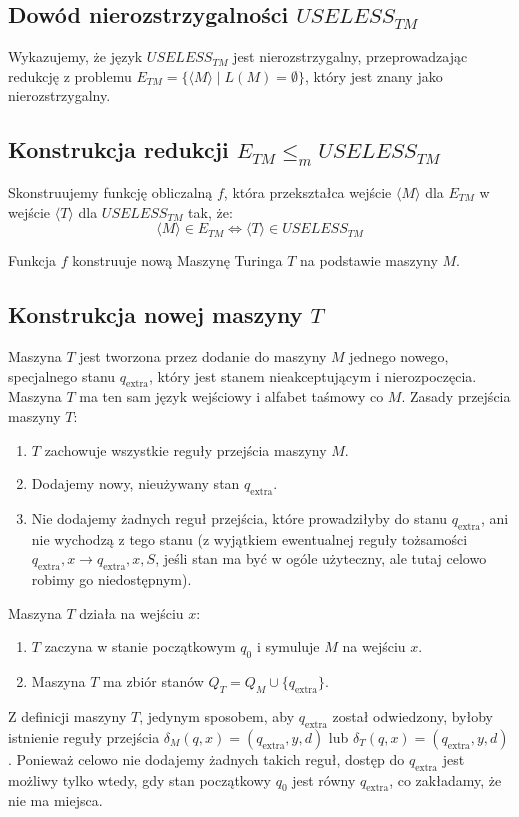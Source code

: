 \documentclass{article}
\begin{document}
\subsection*{Dowód nierozstrzygalności $USELESS_{TM}$}

Wykazujemy, że język $USELESS_{TM}$ jest nierozstrzygalny, przeprowadzając redukcję z problemu $E_{TM} = \{\langle M \rangle \mid L(M) = \emptyset\}$, który jest znany jako nierozstrzygalny.

\subsection*{Konstrukcja redukcji $E_{TM} \le_m USELESS_{TM}$}

Skonstruujemy funkcję obliczalną $f$, która przekształca wejście $\langle M \rangle$ dla $E_{TM}$ w wejście $\langle T \rangle$ dla $USELESS_{TM}$ tak, że:
$$
\langle M \rangle \in E_{TM} \iff \langle T \rangle \in USELESS_{TM}
$$

Funkcja $f$ konstruuje nową Maszynę Turinga $T$ na podstawie maszyny $M$.

\subsection*{Konstrukcja nowej maszyny $T$}

Maszyna $T$ jest tworzona przez dodanie do maszyny $M$ jednego nowego, specjalnego stanu $q_{\mathrm{extra}}$, który jest stanem nieakceptującym i nierozpoczęcia. Maszyna $T$ ma ten sam język wejściowy i alfabet taśmowy co $M$.
Zasady przejścia maszyny $T$:
\begin{enumerate}
    \item $T$ zachowuje wszystkie reguły przejścia maszyny $M$.
    \item Dodajemy nowy, nieużywany stan $q_{\mathrm{extra}}$.
    \item Nie dodajemy żadnych reguł przejścia, które prowadziłyby do stanu $q_{\mathrm{extra}}$, ani nie wychodzą z tego stanu (z wyjątkiem ewentualnej reguły tożsamości $q_{\mathrm{extra}}, x \to q_{\mathrm{extra}}, x, S$, jeśli stan ma być w ogóle użyteczny, ale tutaj celowo robimy go niedostępnym).
\end{enumerate}

Maszyna $T$ działa na wejściu $x$:
\begin{enumerate}
    \item $T$ zaczyna w stanie początkowym $q_0$ i symuluje $M$ na wejściu $x$.
    \item Maszyna $T$ ma zbiór stanów $Q_T = Q_M \cup \{q_{\mathrm{extra}}\}$.
\end{enumerate}
Z definicji maszyny $T$, jedynym sposobem, aby $q_{\mathrm{extra}}$ został odwiedzony, byłoby istnienie reguły przejścia $\delta_M(q, x) = (q_{\mathrm{extra}}, y, d)$ lub $\delta_T(q, x) = (q_{\mathrm{extra}}, y, d)$. Ponieważ celowo nie dodajemy żadnych takich reguł, dostęp do $q_{\mathrm{extra}}$ jest możliwy tylko wtedy, gdy stan początkowy $q_0$ jest równy $q_{\mathrm{extra}}$, co zakładamy, że nie ma miejsca.
\end{document}
